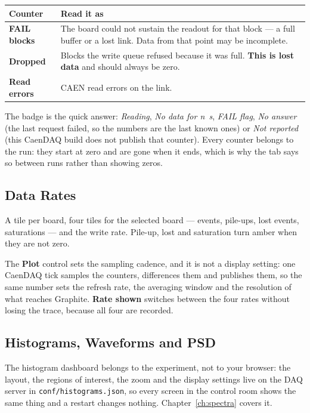 \documentclass[11pt,a4paper]{report}
\newcommand{\ui}[1]{\textbf{#1}}          %
\newcommand{\file}[1]{\texttt{#1}}
\begin{document}
\begin{center}
\begin{tabular}{@{}L{0.22\textwidth}L{0.70\textwidth}@{}}
\toprule
\textbf{Counter} & \textbf{Read it as} \\
\midrule
\ui{FAIL blocks} & The board could not sustain the readout for that block --- a
full buffer or a lost link. Data from that point may be incomplete. \\
\ui{Dropped} & Blocks the write queue refused because it was full. \textbf{This is
lost data} and should always be zero. \\
\ui{Read errors} & CAEN read errors on the link. \\
\bottomrule
\end{tabular}
\end{center}

The badge is the quick answer: \emph{Reading}, \emph{No data for n~s}, \emph{FAIL
flag}, \emph{No answer} (the last request failed, so the numbers are the last
known ones) or \emph{Not reported} (this CaenDAQ build does not publish that
counter). Every counter belongs to the run: they start at zero and are gone when
it ends, which is why the tab says so between runs rather than showing zeros.

\subsection{Data Rates}

A tile per board, four tiles for the selected board --- events, pile-ups, lost
events, saturations --- and the write rate. Pile-up, lost and saturation turn
amber when they are not zero.

The \ui{Plot} control sets the sampling cadence, and it is not a display setting:
one CaenDAQ tick samples the counters, differences them and publishes them, so the
same number sets the refresh rate, the averaging window and the resolution of what
reaches Graphite. \ui{Rate shown} switches between the four rates without losing
the trace, because all four are recorded.

\subsection{Histograms, Waveforms and PSD}

The histogram dashboard belongs to the experiment, not to your browser: the
layout, the regions of interest, the zoom and the display settings live on the DAQ
server in \file{conf/histograms.json}, so every screen in the control room shows
the same thing and a restart changes nothing. Chapter~\ref{ch:spectra} covers it.
\end{document}
